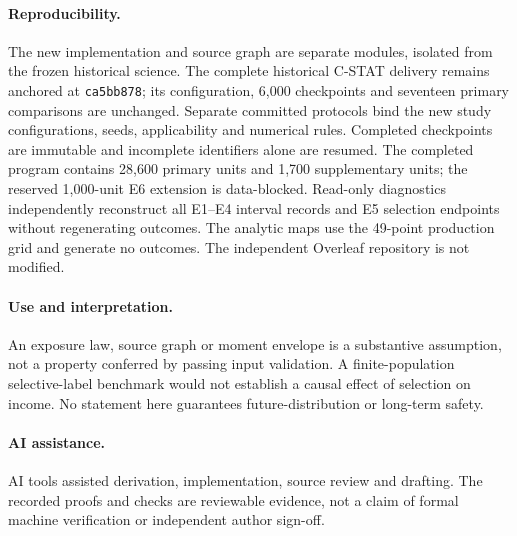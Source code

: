 \documentclass[10pt]{article}
\begin{document}
\paragraph{Reproducibility.}
The new implementation and source graph are separate modules, isolated from
the frozen historical science. The complete historical C-STAT
delivery remains anchored at \texttt{ca5bb878}; its configuration, 6,000
checkpoints and seventeen primary comparisons are unchanged. Separate committed
protocols bind the new study configurations, seeds, applicability and numerical
rules. Completed checkpoints are immutable and incomplete identifiers alone
are resumed. The completed program contains 28,600 primary units and 1,700
supplementary units; the reserved 1,000-unit E6 extension is data-blocked.
Read-only diagnostics independently reconstruct all E1--E4 interval records
and E5 selection endpoints without regenerating outcomes. The analytic maps use the 49-point production grid and generate
no outcomes. The independent Overleaf repository is not modified.

\paragraph{Use and interpretation.}
An exposure law, source graph or moment envelope is a substantive assumption,
not a property conferred by passing input validation. A finite-population
selective-label benchmark would not establish a causal effect of selection on
income. No statement here guarantees future-distribution or long-term safety.

\paragraph{AI assistance.}
AI tools assisted derivation, implementation, source review and drafting.
The recorded proofs and checks are reviewable evidence, not a claim of formal
machine verification or independent author sign-off.
\end{document}
